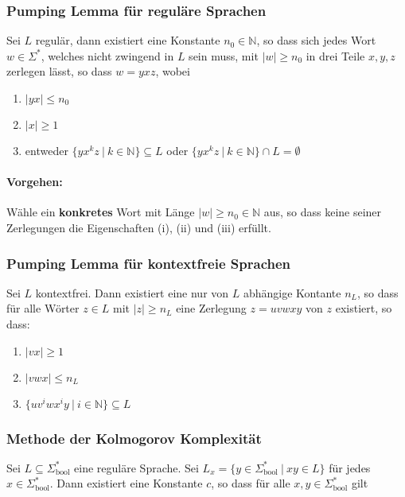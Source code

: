 \documentclass[11pt]{article}
\begin{document}
\subsubsection{Pumping Lemma f{\"u}r regul{\"a}re Sprachen}

Sei $L$ regul{\"a}r, dann existiert eine Konstante $n_0 \in \mathbb{N}$, so dass sich jedes Wort $w \in \Sigma^*$, welches nicht zwingend in $L$ sein muss, mit $|w| \geq n_0$ in drei Teile $x, y, z$ zerlegen l{\"a}sst, so dass $w = yxz$, wobei

\begin{enumerate}[label=(\roman*), noitemsep]
	\item $|yx| \leq n_0$
	\item $|x| \geq 1$
	\item entweder $\{yx^kz\ |\ k \in \mathbb{N}\} \subseteq L$ oder $\{yx^kz\ |\ k \in \mathbb{N}\} \cap L = \emptyset$
\end{enumerate}

\paragraph{Vorgehen:} W{\"a}hle ein \textbf{konkretes} Wort mit L{\"a}nge $|w| \geq n_0 \in \mathbb{N}$ aus, so dass keine seiner Zerlegungen die Eigenschaften (i), (ii) und (iii) erf{\"u}llt.

\subsubsection{Pumping Lemma für kontextfreie Sprachen}

Sei $L$ kontextfrei. Dann existiert eine nur von $L$ abhängige Kontante $n_L$, so dass für alle Wörter $z \in L$ mit $|z| \geq n_L$ eine Zerlegung $z = uvwxy$ von $z$ existiert, so dass:
\begin{enumerate}[label=(\roman*), noitemsep]
	\item $|vx| \geq 1$
	\item $|vwx| \leq n_L$
	\item $\{uv^iwx^iy\ |\ i \in \mathbb{N}\} \subseteq L$
\end{enumerate}

\subsubsection{Methode der Kolmogorov Komplexit{\"a}t}

Sei $L \subseteq \Sigma_\text{bool}^*$ eine regul{\"a}re Sprache. Sei $L_x = \{y \in \Sigma_\text{bool}^*\ |\ xy \in L\}$ f{\"u}r jedes $x \in \Sigma_\text{bool}^*$. Dann existiert eine Konstante $c$, so dass f{\"u}r alle $x,y \in \Sigma_\text{bool}^*$ gilt
\end{document}
